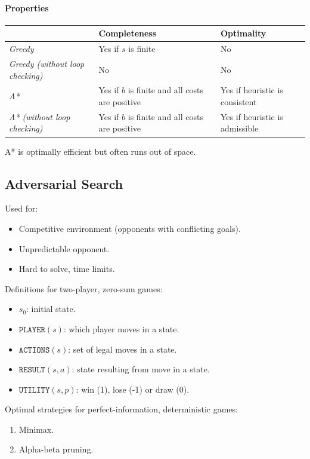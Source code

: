 \documentclass[twocolumn,english]{article}
\providecommand{\tabularnewline}{\\}
\providecommand{\tabularnewline}{\\}
\begin{document}
\paragraph{Properties}

\begin{table}[H]
\centering{}%
\begin{tabular}{>{\centering}m{}>{\centering}m{}>{\centering}m{}}
\toprule 
 & \textbf{\footnotesize{}Completeness} & \textbf{\footnotesize{}Optimality}\tabularnewline
\midrule
\emph{\footnotesize{}Greedy} & {\footnotesize{}Yes if $s$ is finite} & {\footnotesize{}No}\tabularnewline
\emph{\footnotesize{}Greedy (without loop checking)} & {\footnotesize{}No} & {\footnotesize{}No}\tabularnewline
\midrule
\emph{\footnotesize{}A{*}} & {\footnotesize{}Yes if $b$ is finite and all costs are positive} & {\footnotesize{}Yes if heuristic is consistent}\tabularnewline
\emph{\footnotesize{}A{*} (without loop checking)} & {\footnotesize{}Yes if $b$ is finite and all costs are positive} & {\footnotesize{}Yes if heuristic is admissible}\tabularnewline
\bottomrule
\end{tabular}
\end{table}

A{*} is optimally efficient but often runs out of space.

\subsection{Adversarial Search}

Used for:
\begin{itemize}
\item Competitive environment (opponents with conflicting goals).
\item Unpredictable opponent.
\item Hard to solve, time limits.
\end{itemize}
Definitions for two-player, zero-sum games:
\begin{itemize}
\item $s_{0}$: initial state.
\item $\texttt{PLAYER}\left(s\right)$: which player moves in a state.
\item $\texttt{ACTIONS}\left(s\right)$: set of legal moves in a state.
\item $\texttt{RESULT}\left(s,a\right)$: state resulting from move in a
state.
\item $\texttt{UTILITY}\left(s,p\right)$: win (1), lose (-1) or draw (0).
\end{itemize}
Optimal strategies for perfect-information, deterministic games:
\begin{enumerate}
\item Minimax.
\item Alpha-beta pruning.
\end{enumerate}
\end{document}
